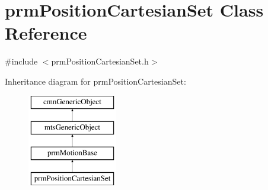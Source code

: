 \hypertarget{classprm_position_cartesian_set}{\section{prm\-Position\-Cartesian\-Set Class Reference}
\label{classprm_position_cartesian_set}
}


{\ttfamily \#include $<$prm\-Position\-Cartesian\-Set.\-h$>$}

Inheritance diagram for prm\-Position\-Cartesian\-Set\-:\begin{figure}[H]
\begin{center}
\leavevmode
\includegraphics[height=4.000000cm]{d9/d6e/classprm_position_cartesian_set}
\end{center}
\end{figure}
